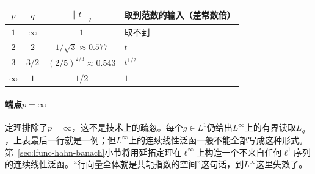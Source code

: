 \begin{BookInlineTable}
  \centering
  \begin{tabular}{@{}cccl@{}}
    \toprule
    $p$ & $q$ & $\lVert t\rVert_q$ & 取到范数的输入（差常数倍）\\
    \midrule
    $1$ & $\infty$ & $1$ & 取不到\\
    $2$ & $2$ & $1/\sqrt3\approx0.577$ & $t$\\
    $3$ & $3/2$ & $(2/5)^{2/3}\approx0.543$ & $t^{1/2}$\\
    $\infty$ & $1$ & $1/2$ & $1$\\
    \bottomrule
  \end{tabular}
  \caption{同一个权重$g(t)=t$在不同$L^p(0,1)$上的读取范数。}
  \label{tab:lfunc-lp-row}
\end{BookInlineTable}

\paragraph{端点\texorpdfstring{$p=\infty$}{p=infinity}}
定理排除了$p=\infty$，这不是技术上的疏忽。每个$g\in L^1$仍给出$L^\infty$上的有界读取$L_g$，上表最后一行就是一例；但$L^\infty$上的连续线性泛函一般不能全部写成这种形式。第~\ref{sec:lfunc-hahn-banach}小节将用延拓定理在$\ell^\infty$上构造一个不来自任何$\ell^1$序列的连续线性泛函。“行向量全体就是共轭指数的空间”这句话，到$L^\infty$这里失效了。
